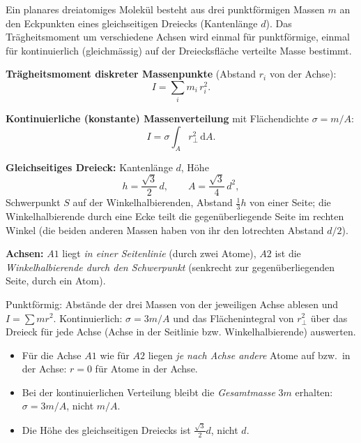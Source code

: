 
Ein planares dreiatomiges Molekül besteht aus drei punktförmigen Massen $m$
an den Eckpunkten eines gleichseitigen Dreiecks (Kantenlänge $d$). Das
Trägheitsmoment um verschiedene Achsen wird einmal für punktförmige, einmal
für kontinuierlich (gleichmässig) auf der Dreiecksfläche verteilte Masse
bestimmt.

\begin{werkzeugkasten}[Werkzeuge]
\textbf{Trägheitsmoment diskreter Massenpunkte} (Abstand $r_i$ von der Achse):
\begin{equation}
  I = \sum_i m_i\, r_i^2.
\end{equation}

\textbf{Kontinuierliche (konstante) Massenverteilung} mit Flächendichte
$\sigma=m/A$:
\begin{equation}
  I = \sigma \int_A r_\perp^2\,\mathrm dA.
\end{equation}

\textbf{Gleichseitiges Dreieck:} Kantenlänge $d$, Höhe
\begin{equation}
  h = \frac{\sqrt3}{2}\,d,
  \qquad
  A = \frac{\sqrt3}{4}\,d^2,
\end{equation}
Schwerpunkt $S$ auf der Winkelhalbierenden, Abstand $\frac13 h$ von einer
Seite; die Winkelhalbierende durch eine Ecke teilt die gegenüberliegende Seite
im rechten Winkel (die beiden anderen Massen haben von ihr den lotrechten
Abstand $d/2$).

\textbf{Achsen:} $A1$ liegt \emph{in einer Seitenlinie} (durch zwei Atome),
$A2$ ist die \emph{Winkelhalbierende durch den Schwerpunkt} (senkrecht zur
gegenüberliegenden Seite, durch ein Atom).
\end{werkzeugkasten}

\begin{werkzeugkasten}
Punktförmig: Abstände der drei Massen von der jeweiligen Achse ablesen und
$I=\sum m r^2$. Kontinuierlich: $\sigma=3m/A$ und das Flächenintegral von
$r_\perp^2$ über das Dreieck für jede Achse (Achse in der Seitlinie bzw.
Winkelhalbierende) auswerten.
\end{werkzeugkasten}

\begin{achtung}
\begin{itemize}
  \item Für die Achse $A1$ wie für $A2$ liegen \emph{je nach Achse andere}
       Atome auf bzw.\ in der Achse: $r=0$ für Atome in der Achse.
  \item Bei der kontinuierlichen Verteilung bleibt die \emph{Gesamtmasse}
       $3m$ erhalten: $\sigma=3m/A$, nicht $m/A$.
  \item Die Höhe des gleichseitigen Dreiecks ist $\frac{\sqrt3}{2}d$, nicht
       $d$.
\end{itemize}
\end{achtung}
